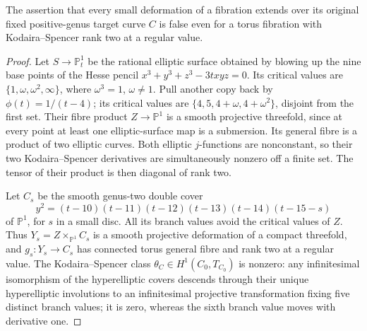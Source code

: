 
\begin{proposition}\label{cdp:st:E10}
The assertion that every small deformation of a fibration extends
over its original fixed positive-genus target curve $C$ is false even for a torus
fibration with Kodaira--Spencer rank two at a regular value.
\end{proposition}
\begin{proof}
Let $S\to\mathbb P^1_t$ be the rational elliptic surface obtained
by blowing up the nine base points of the Hesse pencil
$x^3+y^3+z^3-3txyz=0$. Its critical values are
$\{1,\omega,\omega^2,\infty\}$, where $\omega^3=1$, $\omega\ne1$.
Pull another copy back by $\phi(t)=1/(t-4)$; its critical values
are $\{4,5,4+\omega,4+\omega^2\}$, disjoint from the first set.
Their fibre product $Z\to\mathbb P^1$ is a smooth projective
threefold, since at every point at least one elliptic-surface
map is a submersion. Its general fibre is a product of two
elliptic curves. Both elliptic $j$-functions are nonconstant,
so their two Kodaira--Spencer derivatives are simultaneously
nonzero off a finite set. The tensor of their product is then
diagonal of rank two.

Let $C_s$ be the smooth genus-two double cover
\[
 y^2=(t-10)(t-11)(t-12)(t-13)(t-14)(t-15-s)
\]
of $\mathbb P^1$, for $s$ in a small disc. All its branch values
avoid the critical values of $Z$. Thus
$Y_s=Z\times_{\mathbb P^1}C_s$ is a smooth projective deformation
of a compact threefold, and $g_s:Y_s\to C_s$ has connected torus
general fibre and rank two at a regular value. The Kodaira--Spencer
class $\theta_C\in H^1(C_0,T_{C_0})$ is nonzero: any infinitesimal
isomorphism of the hyperelliptic covers descends through their
unique hyperelliptic involutions to an infinitesimal projective
transformation fixing five distinct branch values; it is zero,
whereas the sixth branch value moves with derivative one.


\end{proof}
